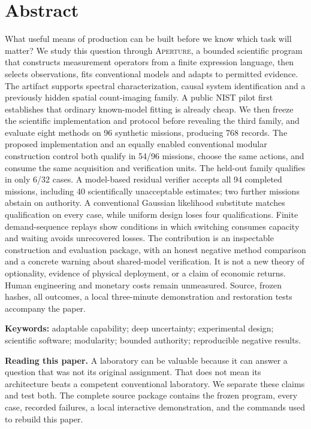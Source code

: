 \documentclass[11pt,letterpaper]{article}
\newcommand{\ap}{\textsc{Aperture}}
\begin{document}
\section*{Abstract}
What useful means of production can be built before we know which task will matter? We study this question through \ap{}, a bounded scientific program that constructs measurement operators from a finite expression language, then selects observations, fits conventional models and adapts to permitted evidence. The artifact supports spectral characterization, causal system identification and a previously hidden spatial count-imaging family. A public NIST pilot first establishes that ordinary known-model fitting is already cheap. We then freeze the scientific implementation and protocol before revealing the third family, and evaluate eight methods on 96 synthetic missions, producing 768 records. The proposed implementation and an equally enabled conventional modular construction control both qualify in 54/96 missions, choose the same actions, and consume the same acquisition and verification units. The held-out family qualifies in only 6/32 cases. A model-based residual verifier accepts all 94 completed missions, including 40 scientifically unacceptable estimates; two further missions abstain on authority. A conventional Gaussian likelihood substitute matches qualification on every case, while uniform design loses four qualifications. Finite demand-sequence replays show conditions in which switching consumes capacity and waiting avoids unrecovered losses. The contribution is an inspectable construction and evaluation package, with an honest negative method comparison and a concrete warning about shared-model verification. It is not a new theory of optionality, evidence of physical deployment, or a claim of economic returns. Human engineering and monetary costs remain unmeasured. Source, frozen hashes, all outcomes, a local three-minute demonstration and restoration tests accompany the paper.

\par\vspace{.4em}
{\small\sffamily\textbf{Keywords:} adaptable capability; deep uncertainty; experimental design; scientific software; modularity; bounded authority; reproducible negative results.}

\begin{finding}
\textbf{Reading this paper.} A laboratory can be valuable because it can answer a question that was not its original assignment. That does not mean its architecture beats a competent conventional laboratory. We separate these claims and test both. The complete source package contains the frozen program, every case, recorded failures, a local interactive demonstration, and the commands used to rebuild this paper.
\end{finding}
\end{document}
